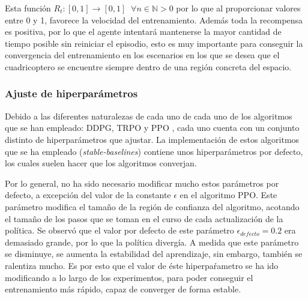 Esta función $R_t:[0,1]\rightarrow [0,1] \;\; \forall n \in \mathbb{N} > 0$ por lo que al proporcionar valores entre 0 y 1, favorece la velocidad del entrenamiento. Además toda la recompensa es positiva, por lo que el agente intentará mantenerse la mayor cantidad de tiempo posible sin reiniciar el episodio, esto es muy importante para conseguir la convergencia del entrenamiento en los escenarios en los que se desea que el cuadricoptero se encuentre siempre dentro de una región concreta del espacio. 

\subsubsection{Ajuste de hiperparámetros}

Debido a las diferentes naturalezas de cada uno de cada uno de los algoritmos que se han empleado: DDPG, TRPO y PPO , cada uno cuenta con un conjunto distinto de hiperparámetros que ajustar. La implementación de estos algoritmos que se ha empleado (\textit{stable-baselines}) contiene unos hiperparámetros por defecto, los cuales suelen hacer que los algoritmos converjan.

Por lo general, no ha sido necesario modificar mucho estos parámetros por defecto, a excepción del valor de la constante $\epsilon$ en el algoritmo PPO. Este parámetro modifica el tamaño de la región de confianza del algoritmo, acotando el tamaño de los pasos que se toman en el curso de cada actualización de la política. Se observó que el valor por defecto de este parámetro $\epsilon_{defecto} = 0.2$ era demasiado grande, por lo que la política divergía. A medida que este parámetro se disminuye, se aumenta la estabilidad del aprendizaje, sin embargo, también se ralentiza mucho. Es por esto que el valor de éste hiperpaŕametro se ha ido modificando a lo largo de los experimentos, para poder conseguir el entrenamiento más rápido, capaz de converger de forma estable. 



